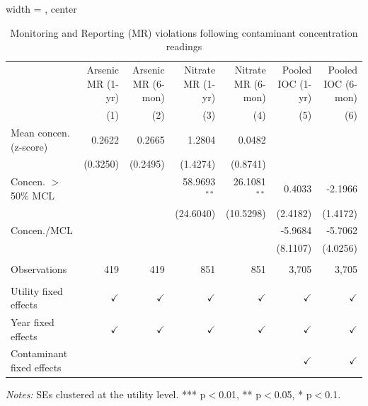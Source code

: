 
\begin{table}[htbp]
\caption{Monitoring and Reporting (MR) violations following contaminant concentration readings}\label{tab:mr_concentration_lag}
\centering
\begin{adjustbox}{width = \textwidth, center}
   \begin{tabular}{lrrrrrr}
      \toprule    
                                       & Arsenic MR (1-yr) & Arsenic MR (6-mon)  & Nitrate MR (1-yr) & Nitrate MR (6-mon)  & Pooled IOC (1-yr) & Pooled IOC (6-mon) \\   
                                       & (1)               & (2)                 & (3)               & (4)                 & (5)               & (6)\\  
      \midrule 
      Mean concen. (z-score)                    & 0.2622            & 0.2665              & 1.2804            & 0.0482              &                   &   \\   
                                       & (0.3250)          & (0.2495)            & (1.4274)          & (0.8741)            &                   &   \\   
      Concen. $>$ 50\% MCL                        &                   &                     & 58.9693$^{**}$    & 26.1081$^{**}$      & 0.4033            & -2.1966\\   
                                       &                   &                     & (24.6040)         & (10.5298)           & (2.4182)          & (1.4172)\\   
      Concen./MCL                            &                   &                     &                   &                     & -5.9684           & -5.7062\\   
                                       &                   &                     &                   &                     & (8.1107)          & (4.0256)\\   
       \\
      Observations                     & 419               & 419                 & 851               & 851                 & 3,705             & 3,705\\  
       \\
      Utility fixed effects              & $\checkmark$      & $\checkmark$        & $\checkmark$      & $\checkmark$        & $\checkmark$      & $\checkmark$\\   
      Year fixed effects               & $\checkmark$      & $\checkmark$        & $\checkmark$      & $\checkmark$        & $\checkmark$      & $\checkmark$\\   
      Contaminant fixed effects  &                   &                     &                   &                     & $\checkmark$      & $\checkmark$\\   
      \bottomrule
   \end{tabular}
\end{adjustbox}
{\tiny\linespread{1}\selectfont \par \raggedright \textit{Notes:} SEs clustered at the utility level. *** p$<$0.01, ** p$<$0.05, * p$<$0.1.}
\end{table}
